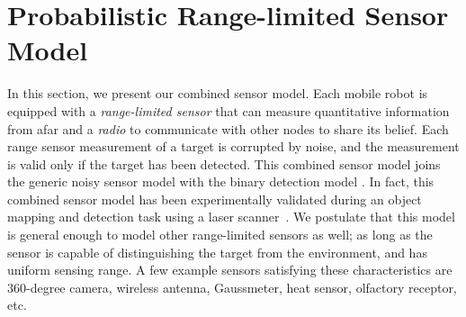 \documentclass[letterpaper, 10 pt, conference]{ieeeconf}
\newcommand{\Ram}[1]{{\normalsize{\textbf{({\color{green}Ram:\ }#1)}}}}
\begin{document}



\section{Probabilistic Range-limited Sensor Model}
\label{sec:sec3}
In this section, we present our combined sensor model. Each mobile robot is equipped with a \emph{range-limited sensor} that can measure quantitative information from afar and a \emph{radio} to communicate with other nodes to share its belief. 
Each range sensor measurement of a target is corrupted by noise, and the measurement is valid only if the target has been detected.
This combined sensor model joins the generic noisy sensor model with the binary detection model \cite{viswanathan1997distributed,djuric2008target}.
In fact, this combined sensor model has been experimentally validated during an object mapping and detection task using a laser scanner~\cite{anguelov2004detecting}.
We postulate that this model is general enough to model other range-limited sensors as well; as long as the sensor is capable of distinguishing the target from the environment, and has uniform sensing range. 
A few example sensors satisfying these characteristics are 360-degree camera, wireless antenna, Gaussmeter, heat sensor, olfactory receptor, etc.
\end{document}

